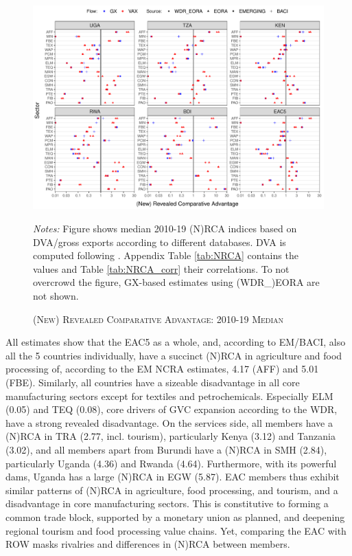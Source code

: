 \documentclass[a4paper]{article}
\begin{document}
\begin{figure}[h!] 
\centering
\caption{\label{fig:NRCA}\textsc{(New) Revealed Comparative Advantage: 2010-19 Median}}
\includegraphics[width=1\textwidth]{"NRCA_EAC5_ALL.pdf"} \\
\raggedright
\scriptsize
\emph{Notes:} Figure shows median 2010-19 (N)RCA indices based on DVA/gross exports according to different databases. DVA is computed following \citet{borin2019measuring}. Appendix Table \ref{tab:NRCA} contains the values and Table \ref{tab:NRCA_corr} their correlations. To not overcrowd the figure, GX-based estimates using (WDR\_)EORA are not shown. 
\end{figure}
\FloatBarrier

All estimates show that the EAC5 as a whole, and, according to EM/BACI, also all the 5 countries individually, have a succinct (N)RCA in agriculture and food processing of, according to the EM NCRA estimates, 4.17 (AFF) and 5.01 (FBE). Similarly, all countries have a sizeable disadvantage in all core manufacturing sectors except for textiles and petrochemicals. Especially ELM (0.05) and TEQ (0.08), core drivers of GVC expansion according to the WDR, have a strong revealed disadvantage. On the services side, all members have a (N)RCA in TRA (2.77, incl. tourism), particularly Kenya (3.12) and Tanzania (3.02), and all members apart from Burundi have a (N)RCA in SMH (2.84), particularly Uganda (4.36) and Rwanda (4.64). Furthermore, with its powerful dams, Uganda has a large (N)RCA in EGW (5.87). EAC members thus exhibit similar patterns of (N)RCA in agriculture, food processing, and tourism, and a disadvantage in core manufacturing sectors. This is constitutive to forming a common trade block, supported by a monetary union as planned, and deepening regional tourism and food processing value chains. Yet, comparing the EAC with ROW masks rivalries and differences in (N)RCA between members. 
\end{document}
